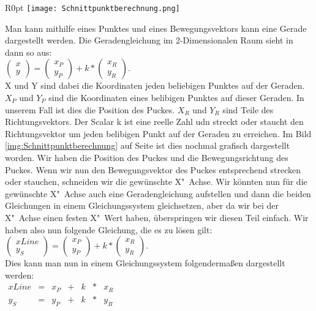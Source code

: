 \begin{wrapfigure}{R}{0pt}
\vspace{-15pt}
\texttt{[image: Schnittpunktberechnung.png]}
\vspace{-15pt}
\caption{Veranschaulichung der Schnittpunktberechnung}
\vspace{-15pt}
\label{img:Schnittpunktberechnung}
\end{wrapfigure}

Man kann mithilfe eines Punktes und eines Bewegungsvektors kann eine Gerade dargestellt werden. Die Geradengleichung im 2-Dimensionalen Raum sieht in dann so aus: \\
$\left(\begin{array}{c} x \\ y \end{array}\right) = \left(\begin{array}{c} x_P \\ y_P \end{array}\right) + k * \left(\begin{array}{c} x_R \\ y_R \end{array}\right)$. \\
X und Y sind dabei die Koordinaten jeden beliebigen Punktes auf der Geraden. $X_P$ und $Y_P$ sind die Koordinaten eines belibigen Punktes auf dieser Geraden. In unserem Fall ist dies die Position des Puckes. $X_R$ und $Y_R$ sind Teile des Richtungsvektors. Der Scalar k ist eine reelle Zahl udn streckt oder staucht den Richtungsvektor um jeden belibigen Punkt auf der Geraden zu erreichen. Im Bild \ref{img:Schnittpunktberechnung} auf Seite \pageref{img:Schnittpunktberechnung} ist dies nochmal grafisch dargestellt worden. Wir haben die Position des Puckes und die Bewegungsrichtung des Puckes. Wenn wir nun den Bewegungsvektor des Puckes entsprechend strecken oder stauchen, schneiden wir die gewünschte X"~Achse. Wir könnten nun für die gewünschte X"~Achse auch eine Geradengleichung aufstellen und dann die beiden Gleichungen in einem Gleichungssystem gleichsetzen, aber da wir bei der X"~Achse einen festen X"~Wert haben, überspringen wir diesen Teil einfach. Wir haben also nun folgende Gleichung, die es zu lösen gilt: \\
$\left(\begin{array}{c} xLine \\ y_S \end{array}\right) = \left(\begin{array}{c} x_P \\ y_P \end{array}\right) + k * \left(\begin{array}{c} x_R \\ y_R \end{array}\right)$. \\
Dies kann man nun in einem Gleichungssystem folgendermaßen dargestellt werden: \\
$
\begin{array}{ccccccc}
xLine & = & x_P & + & k & * & x_R \\
y_S & = & y_P & + & k & * & y_R
\end{array}
$ \\

